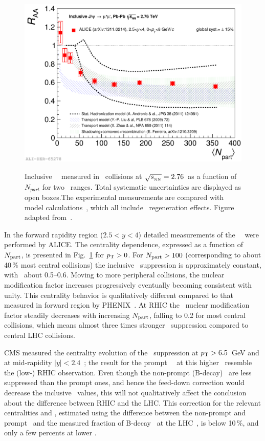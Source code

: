 \begin{figure}[!ht]
\begin{center}
\includegraphics[width=0.49\linewidth]{quarkoniafigs/JpsiRAAcentrality.pdf}
\label{fig:KS:RaavsCent} 
\caption{Inclusive \jpsi\ \Raa\ measured in \PbPb\
collisions at $\sqrt{s_{_{\rm NN}}} = 2.76$\TeV\ as a function of $N_{part}$ for two \pT\ ranges.
Total systematic uncertainties are displayed as open boxes.The experimental measurements are compared with
model calculations~\cite{Andronic:2011yq,Liu:2009nb,Zhao:2011cv,Ferreiro:2012rq}, which all include \Jpsi\ regeneration effects. Figure adapted from~\cite{Abelev:2012rv}.}
\end{center}
\end{figure}

In the forward rapidity region ($2.5 < y < 4$) detailed measurements of the \Jpsi\ \Raa\ were performed by ALICE. The centrality dependence, expressed as a function of $N_{\rm part}$, is presented in Fig.~\ref{fig:KS:RaavsCent} for $\mbox{$p_{\mathrm{T}}$} > 0$. For $N_{\rm part} > 100$ (corresponding to about 40\,\% most central collisions) the inclusive \Jpsi\ suppression is approximately constant, with \Raa\ about 0.5--0.6. Moving to more peripheral collisions, the nuclear modification factor increases progressively eventually becoming consistent with unity. This centrality behavior is qualitatively different compared to that measured in forward region by PHENIX~\cite{Adare:2011yf}. At RHIC the \Jpsi\ nuclear modification factor steadily decreases with increasing $N_{\rm part}$, falling to 0.2 for most central collisions, which means almost three times stronger \Jpsi\ suppression compared to central LHC collisions.

CMS measured the centrality evolution of the \Jpsi\ suppression at $\mbox{$p_{\mathrm{T}}$} > 6.5$~GeV and at mid-rapidity $|y| < 2.4$~\cite{Chatrchyan:2012np,CMS:2012wba}; the result for the prompt \Jpsi\ \Raa\ at this higher \pt\ resemble the (low-\pt) RHIC observation. Even though the non-prompt (B-decay) \Jpsi\ are less suppressed than the prompt ones, and hence the feed-down correction would decrease the inclusive \Raa\ values, this will not qualitatively affect the conclusion about the difference between RHIC and the LHC. This correction for the relevant centralities and \pt, estimated using the difference between the non-prompt and prompt \Raa\ and the measured fraction of B-decay \Jpsi\ at the LHC~\cite{Khachatryan:2010yr,Aaij:2011jh,Aad:2011sp,Chatrchyan:2012np,Abelev:2012gx}, is below 10\,\%, and only a few percents at lower \pt.

